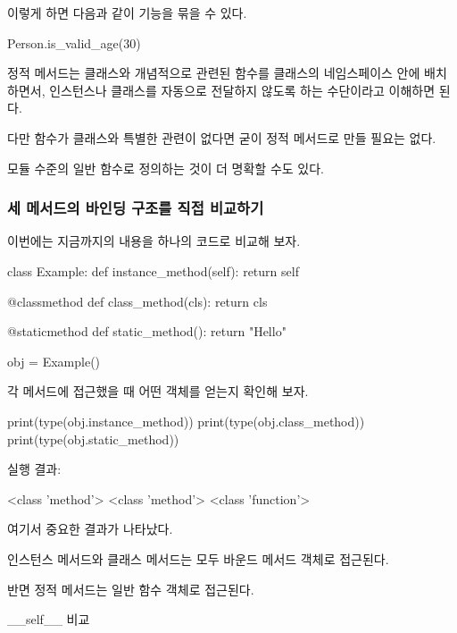 이렇게 하면 다음과 같이 기능을 묶을 수 있다.

\begin{dhkcode}
Person.is_valid_age(30)
\end{dhkcode}

정적 메서드는 클래스와 개념적으로 관련된 함수를 클래스의 네임스페이스 안에 배치하면서, 인스턴스나 클래스를 자동으로 전달하지 않도록 하는 수단이라고 이해하면 된다.

다만 함수가 클래스와 특별한 관련이 없다면 굳이 정적 메서드로 만들 필요는 없다.

모듈 수준의 일반 함수로 정의하는 것이 더 명확할 수도 있다.

\subsubsection{세 메서드의 바인딩 구조를 직접 비교하기}

이번에는 지금까지의 내용을 하나의 코드로 비교해 보자.

\begin{dhkcode}
class Example:
    def instance_method(self):
        return self

    @classmethod
    def class_method(cls):
        return cls

    @staticmethod
    def static_method():
        return "Hello"

obj = Example()
\end{dhkcode}

각 메서드에 접근했을 때 어떤 객체를 얻는지 확인해 보자.

\begin{dhkcode}
print(type(obj.instance_method))
print(type(obj.class_method))
print(type(obj.static_method))
\end{dhkcode}

실행 결과:

\begin{dhkzsh}
<class 'method'>
<class 'method'>
<class 'function'>
\end{dhkzsh}

여기서 중요한 결과가 나타났다.

인스턴스 메서드와 클래스 메서드는 모두 바운드 메서드 객체로 접근된다.

반면 정적 메서드는 일반 함수 객체로 접근된다.

\begin{dhknote}
\begin{dhksmry}[centered]
__self__ 비교
\end{dhksmry}
\end{dhknote}

